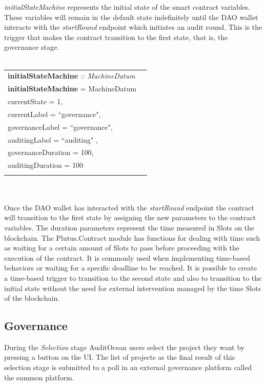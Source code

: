 \documentclass[9pt]{article}
\begin{document}
 \emph{initialStateMachine} represents the initial state of the smart contract variables. These variables will remain in the default state indefinitely until the DAO wallet interacts with the \emph{startRound} endpoint which initiates an audit round. This is the trigger that makes the contract transition to the first state, that is, the governance stage.
\\
\\
\begin{tabular}{lr}
\textbf{initialStateMachine} \emph{:: MachineDatum}\\
\textbf{initialStateMachine}  = MachineDatum  \textbraceleft{}
\\ \hspace{60mm}currentState = 1, 
\\ \hspace{60mm}currentLabel = ``governance",
\\ \hspace{60mm}governanceLabel = ``governance",
\\ \hspace{60mm}auditingLabel = ``auditing" ,
\\ \hspace{60mm}governanceDuration = 100,
\\ \hspace{60mm}auditingDuration = 100
\\\hspace{60mm}\textbraceright{} 
\end{tabular}
\\
\\
Once the DAO wallet has interacted with the \emph{startRound} endpoint the contract will transition to the first state by assigning the new parameters to the contract variables. The duration parameters represent the time measured in Slots on the blockchain. The Plutus.Contract module has functions for dealing with time such as waiting for a certain amount of Slots to pass before proceeding with the execution of the contract. It is commonly used when implementing time-based behaviors or waiting for a specific deadline to be reached. It is possible to create a time-based trigger to transition to the second state and also to transition to the initial state without the need for external intervention managed by the time Slots of the blockchain.

\subsection { Governance } 
During the \emph{Selection} stage AuditOcean users select the project they want by pressing a button on the UI. The list of projects as the final result of this selection stage is submitted to a poll in an external governance platform called the summon platform.
\end{document}
